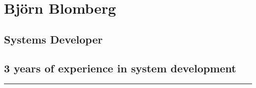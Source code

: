 \documentclass{article}
\begin{document}
	
	\begin{minipage}[t]{0.7\textwidth}
		\titleformat{\section}{\Huge\bfseries}{\thesection}{1em}{}
		\section*{\textcolor{colorBlue}{Björn Blomberg}}
		\subsection*{\textcolor{colorTitelErfarenhet}{Systems Developer}}
		\subsection*{3 years of experience in system development}
		\rule{10cm}{0.4pt}
		\titleformat{\section}{\Large\bfseries}{\thesection}{1em}{}
		\vspace{1.5cm}
	\end{minipage}%
	\begin{minipage}[t]{0.3\textwidth}
		\vspace{-10pt} %
	\end{minipage}%
	
\end{document}

